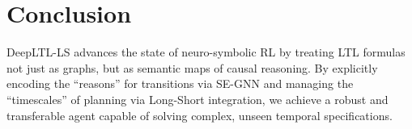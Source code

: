 \documentclass{article}
\begin{document}
\section{Conclusion}
DeepLTL-LS advances the state of neuro-symbolic RL by treating LTL formulas not just as graphs, but as semantic maps of causal reasoning. By explicitly encoding the ``reasons'' for transitions via SE-GNN and managing the ``timescales'' of planning via Long-Short integration, we achieve a robust and transferable agent capable of solving complex, unseen temporal specifications.
\end{document}
